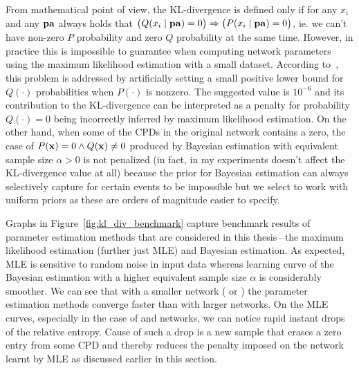 \documentclass[english,cover]{fitthesis} %
\newcommand{\vars}[1]{{\bold{#1}}}         %
\begin{document}
From mathematical point of view, the KL-divergence is defined only if for any $x_i$ and any $\vars{pa}$ always holds that $\bigl( Q(x_i \mid \vars{pa}) = 0 \bigr) \Rightarrow \bigl( P(x_i \mid \vars{pa}) = 0 \bigr)$, ie. we can't have non-zero $P$ probability and zero $Q$ probability at the same time. However, in practice this is impossible to guarantee when computing network parameters using the maximum likelihood estimation with a small dataset. According to~\cite{kl_divergence_wifi,kl_divergence_noisy_max}, this problem is addressed by artificially setting a small positive lower bound for $Q(\cdot)$ probabilities when $P(\cdot)$ is nonzero. The suggested value is $10^{-6}$ and its contribution to the KL-divergence can be interpreted as a penalty for probability $Q(\cdot) = 0$ being incorrectly inferred by maximum likelihood estimation. On the other hand, when some of the CPDs in the original network contains a zero, the case of $P(\vars{x}) = 0 \land Q(\vars{x}) \neq 0$ produced by Bayesian estimation with equivalent sample size $\alpha > 0$ is not penalized (in fact, in my experiments doesn't affect the KL-divergence value at all) because the prior for Bayesian estimation can always selectively capture for certain events to be impossible but we select to work with uniform priors as these are orders of magnitude easier to specify.

Graphs in Figure~\ref{fig:kl_div_benchmark} capture benchmark results of parameter estimation methods that are considered in this thesis\,--\,the maximum likelihood estimation (further just MLE) and Bayesian estimation. As expected, MLE is sensitive to random noise in input data whereas learning curve of the Bayesian estimation with a higher equivalent sample size $\alpha$ is considerably smoother. We can see that with a smaller network ( or ) the parameter estimation methods converge faster than with larger networks. On the MLE curves, especially in the case of  and  networks, we can notice rapid instant drops of the relative entropy. Cause of such a drop is a new sample that erases a zero entry from some CPD and thereby reduces the penalty imposed on the network learnt by MLE as discussed earlier in this section.
\end{document}
